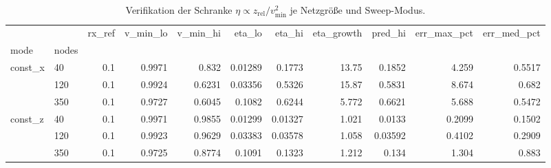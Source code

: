 \begin{table}[htbp]
\centering
\caption{Verifikation der Schranke $\eta\propto z_{\mathrm{rel}}/v_{\min}^{2}$ je Netzgr\"o\ss e und Sweep-Modus.}
\label{tab:rx-vmin}
\begin{tabular}{llrrrrrrrrr}
\toprule
 &  & rx_ref & v_min_lo & v_min_hi & eta_lo & eta_hi & eta_growth & pred_hi & err_max_pct & err_med_pct \\
mode & nodes &  &  &  &  &  &  &  &  &  \\
\midrule
\multirow[t]{3}{*}{const_x} & 40 & 0.1 & 0.9971 & 0.832 & 0.01289 & 0.1773 & 13.75 & 0.1852 & 4.259 & 0.5517 \\
 & 120 & 0.1 & 0.9924 & 0.6231 & 0.03356 & 0.5326 & 15.87 & 0.5831 & 8.674 & 0.682 \\
 & 350 & 0.1 & 0.9727 & 0.6045 & 0.1082 & 0.6244 & 5.772 & 0.6621 & 5.688 & 0.5472 \\
\cline{1-11}
\multirow[t]{3}{*}{const_z} & 40 & 0.1 & 0.9971 & 0.9855 & 0.01299 & 0.01327 & 1.021 & 0.0133 & 0.2099 & 0.1502 \\
 & 120 & 0.1 & 0.9923 & 0.9629 & 0.03383 & 0.03578 & 1.058 & 0.03592 & 0.4102 & 0.2909 \\
 & 350 & 0.1 & 0.9725 & 0.8774 & 0.1091 & 0.1323 & 1.212 & 0.134 & 1.304 & 0.883 \\
\cline{1-11}
\bottomrule
\end{tabular}
\end{table}
